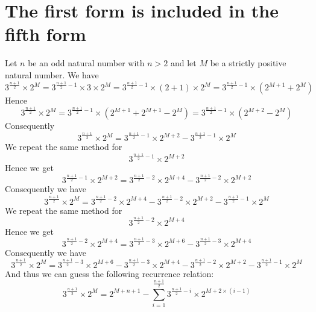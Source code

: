 \documentclass[11pt,a4paper]{article}
\theoremstyle{definition}
\begin{document}
\section{The first form is included in the fifth form}\label{sec:first-fifth}
Let $n$ be an odd natural number with $n>2$ and let $M$ be a strictly positive natural
number. We have
\begin{equation}
3^{\frac{n+1}{2}}\times 2^{M}=3^{\frac{n+1}{2}-1}\times 3\times 2^{M}
=3^{\frac{n+1}{2}-1}\times(2+1)\times 2^{M}
=3^{\frac{n+1}{2}-1}\times\left(2^{M+1}+2^{M}\right)
\end{equation}
Hence
\begin{equation}
3^{\frac{n+1}{2}}\times 2^{M}=3^{\frac{n+1}{2}-1}\times\left(2^{M+1}+2^{M+1}-2^{M}\right)
=3^{\frac{n+1}{2}-1}\times\left(2^{M+2}-2^{M}\right)
\end{equation}
Consequently
\begin{equation}
3^{\frac{n+1}{2}}\times 2^{M}=3^{\frac{n+1}{2}-1}\times 2^{M+2}-3^{\frac{n+1}{2}-1}\times 2^{M}
\end{equation}
We repeat the same method for
\begin{equation}
3^{\frac{n+1}{2}-1}\times 2^{M+2}
\end{equation}
Hence we get
\begin{equation}
3^{\frac{n+1}{2}-1}\times 2^{M+2}=3^{\frac{n+1}{2}-2}\times 2^{M+4}-3^{\frac{n+1}{2}-2}\times 2^{M+2}
\end{equation}
Consequently we have
\begin{equation}
3^{\frac{n+1}{2}}\times 2^{M}=3^{\frac{n+1}{2}-2}\times 2^{M+4}-3^{\frac{n+1}{2}-2}\times 2^{M+2}-3^{\frac{n+1}{2}-1}\times 2^{M}
\end{equation}
We repeat the same method for
\begin{equation}
3^{\frac{n+1}{2}-2}\times 2^{M+4}
\end{equation}
Hence we get
\begin{equation}
3^{\frac{n+1}{2}-2}\times 2^{M+4}=3^{\frac{n+1}{2}-3}\times 2^{M+6}-3^{\frac{n+1}{2}-3}\times 2^{M+4}
\end{equation}
Consequently we have
\begin{equation}
3^{\frac{n+1}{2}}\times 2^{M}=3^{\frac{n+1}{2}-3}\times 2^{M+6}-3^{\frac{n+1}{2}-3}\times 2^{M+4}-3^{\frac{n+1}{2}-2}\times 2^{M+2}-3^{\frac{n+1}{2}-1}\times 2^{M}
\end{equation}
And thus we can guess the following recurrence relation:
\begin{equation}
3^{\frac{n+1}{2}}\times 2^{M}=2^{M+n+1}-\sum_{i=1}^{\frac{n+1}{2}}3^{\frac{n+1}{2}-i}\times 2^{M+2\times(i-1)}
\end{equation}
\end{document}
